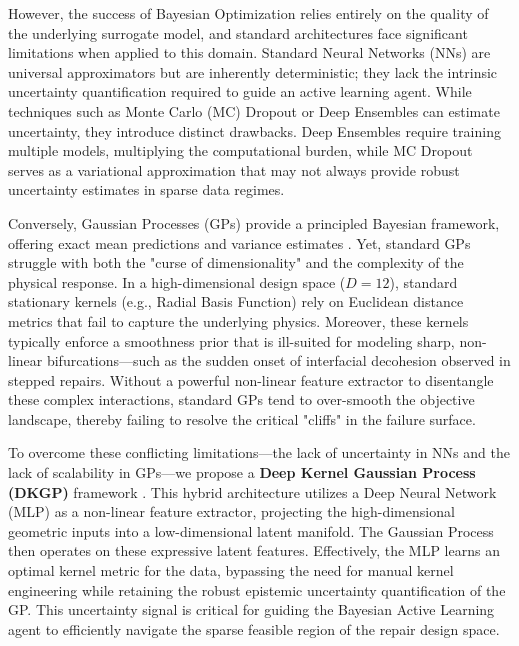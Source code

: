 \documentclass[
  preprint,
  12pt,
  a4paper
]{elsarticle}
\begin{document}
However, the success of Bayesian Optimization relies entirely on the quality of the underlying surrogate model, and standard architectures face significant limitations when applied to this domain. Standard Neural Networks (NNs) are universal approximators but are inherently deterministic; they lack the intrinsic uncertainty quantification required to guide an active learning agent. While techniques such as Monte Carlo (MC) Dropout \cite{gal2016dropout} or Deep Ensembles \cite{lakshminarayanan2017simple} can estimate uncertainty, they introduce distinct drawbacks. Deep Ensembles require training multiple models, multiplying the computational burden, while MC Dropout serves as a variational approximation that may not always provide robust uncertainty estimates in sparse data regimes.


Conversely, Gaussian Processes (GPs) provide a principled Bayesian framework, offering exact mean predictions and variance estimates \cite{rasmussen2006gaussian}. Yet, standard GPs struggle with both the "curse of dimensionality" and the complexity of the physical response. In a high-dimensional design space ($D=12$), standard stationary kernels (e.g., Radial Basis Function) rely on Euclidean distance metrics that fail to capture the underlying physics. Moreover, these kernels typically enforce a smoothness prior that is ill-suited for modeling sharp, non-linear bifurcations—such as the sudden onset of interfacial decohesion observed in stepped repairs. Without a powerful non-linear feature extractor to disentangle these complex interactions, standard GPs tend to over-smooth the objective landscape, thereby failing to resolve the critical "cliffs" in the failure surface.

To overcome these conflicting limitations—the lack of uncertainty in NNs and the lack of scalability in GPs—we propose a \textbf{Deep Kernel Gaussian Process (DKGP)} framework \cite{wilson2016deep}. This hybrid architecture utilizes a Deep Neural Network (MLP) as a non-linear feature extractor, projecting the high-dimensional geometric inputs into a low-dimensional latent manifold. The Gaussian Process then operates on these expressive latent features. Effectively, the MLP learns an optimal kernel metric for the data, bypassing the need for manual kernel engineering while retaining the robust epistemic uncertainty quantification of the GP. This uncertainty signal is critical for guiding the Bayesian Active Learning agent to efficiently navigate the sparse feasible region of the repair design space.
\end{document}
